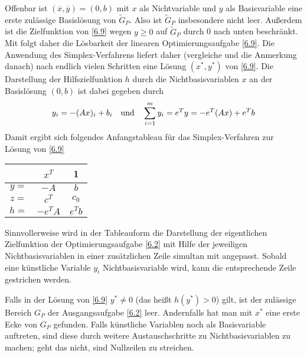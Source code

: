 Offenbar ist $(\overline{x},\overline{y})=(0,b)$ mit $x$ als Nichtvariable und $y$ als Basisvariable eine erste zulässige Basislösung von $\tilde{G}_P$. Also ist $\tilde{G}_P$ insbesondere nicht leer. Außerdem ist die Zielfunktion von \cref{6.9} wegen $y\ge 0$ auf $\tilde{G}_P$ durch 0 nach unten beschränkt. Mit  folgt daher die Lösbarkeit der linearen Optimierungsaufgabe \cref{6.9}. Die Anwendung des Simplex-Verfahrens liefert daher (vergleiche  und die Anmerkung danach) nach endlich vielen Schritten eine Lösung $(x^\ast,y^\ast)$ von \cref{6.9}. Die Darstellung der Hilfszielfunktion $h$ durch die Nichtbasisvariablen $x$ an der Basislösung $(0,b)$ ist dabei gegeben durch 
\begin{align}
	y_i = -(Ax)_i + b_i\quad\text{und}\quad \sum_{i=1}^m y_i = e^Ty = -e^T(Ax)+e^Tb\notag
\end{align}
Damit ergibt sich folgendes Anfangstableau für das Simplex-Verfahren zur Lösung von \cref{6.9}
\begin{center}
	\begin{tabular}{c|c|c}
		& $x^T$ & 1 \\
		\hline
		$y=$ & $-A$ & $b$ \\
		\hline
		$z=$ & $c^T$ & $c_0$ \\
		\hline
		$h=$ & $-e^TA$ & $e^Tb$ \\
	\end{tabular}
\end{center}
Sinnvollerweise wird in der Tableauform die Darstellung der eigentlichen Zielfunktion der Optimierungsaufgabe \cref{6.2} mit Hilfe der jeweiligen Nichtbasisvariablen in einer zusätzlichen Zeile simultan mit angepasst. Sobald eine künstliche Variable $y_i$ Nichtbasisvariable wird, kann die entsprechende Zeile gestrichen werden.

Falls in der Lösung von \cref{6.9} $y^\ast\neq 0$ (das heißt $h(y^\ast)>0$) gilt, ist der zulässige Bereich $G_P$ der Ausgangsaufgabe \cref{6.2} leer. Andernfalls hat man mit $x^\ast$ eine erste Ecke von $G_P$ gefunden. Falls künstliche Variablen noch als Basisvariable auftreten, sind diese durch weitere Austauschschritte zu Nichtbasisvariablen zu machen; geht das nicht, sind Nullzeilen zu streichen.

